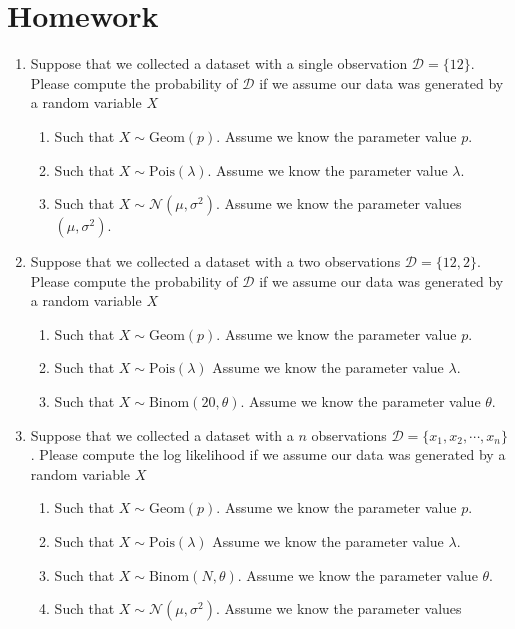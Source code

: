 \section{Homework}

\begin{enumerate}
    \item Suppose that we collected a dataset with a single observation $\mathcal{D} = \{ 12 \}$. Please compute the probability of $\mathcal{D}$ if we assume our data was generated by a random variable $X$
    \begin{enumerate}
        \item Such that $X \sim \text{Geom}(p)$. Assume we know the parameter value $p$. 
        \item Such that $X \sim \text{Pois}(\lambda)$. Assume we know the parameter value $\lambda$. 
        \item Such that $X \sim \mathcal{N}(\mu,\sigma^{2})$.
        Assume we know the parameter values $(\mu, \sigma^{2})$.
    \end{enumerate}
    
    \item Suppose that we collected a dataset with a two observations $\mathcal{D} = \{ 12, 2 \}$. Please compute the probability of $\mathcal{D}$ if we assume our data was generated by a random variable $X$
        \begin{enumerate}
        \item Such that $X \sim \text{Geom}(p)$. Assume we know the parameter value $p$. 
        \item Such that $X \sim \text{Pois}(\lambda)$ Assume we know the parameter value $\lambda$. 
        \item Such that $X \sim \text{Binom}(20, \theta)$.
        Assume we know the parameter value $\theta$.
    \end{enumerate}
    
    \item Suppose that we collected a dataset with a $n$ observations $\mathcal{D} = \{ x_{1}, x_{2}, \cdots, x_{n} \}$. Please compute the log likelihood if we assume our data was generated by a random variable $X$
        \begin{enumerate}
        \item Such that $X \sim \text{Geom}(p)$. Assume we know the parameter value $p$. 
        \item Such that $X \sim \text{Pois}(\lambda)$ Assume we know the parameter value $\lambda$. 
        \item Such that $X \sim \text{Binom}(N, \theta)$.
        Assume we know the parameter value $\theta$.
        \item Such that $X \sim \mathcal{N}(\mu,\sigma^{2})$.
        Assume we know the parameter values
    \end{enumerate}
    

\end{enumerate}
